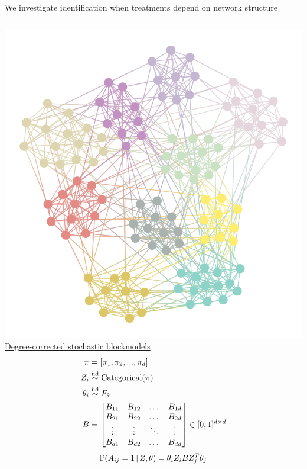 \documentclass[aspectratio=169]{beamer}
\theoremstyle{remark}
\begin{document}
\begin{frame}{We investigate identification when treatments depend on network structure}
    \begin{columns}
        \centering
        \includegraphics[width=\textwidth]{./assortative.png}
        \underline{Degree-corrected stochastic blockmodels}
        \begin{align*}
            \pi      & = [\pi_1, \pi_2, ..., \pi_d]  \\
            Z_i      & \stackrel{\mathrm{iid}}{\sim} \text{Categorical}(\pi) \\
            \theta_i & \stackrel{\mathrm{iid}}{\sim} F_\theta                \\
            B        & = 
            \begin{bmatrix}
                B_{11} & B_{12} & \dots  & B_{1d} \\
                B_{21} & B_{22} & \dots  & B_{2d} \\
                \vdots & \vdots & \ddots & \vdots \\
                B_{d1} & B_{d2} & \dots  & B_{dd} \\
            \end{bmatrix} \in [0, 1]^{d \times d}
        \end{align*}
        \begin{equation*}
            \P[\Z, \theta]{A_{ij} = 1} = \theta_i Z_i B Z_j^T \theta_j
        \end{equation*}
    \end{columns}
\end{frame}
\end{document}
